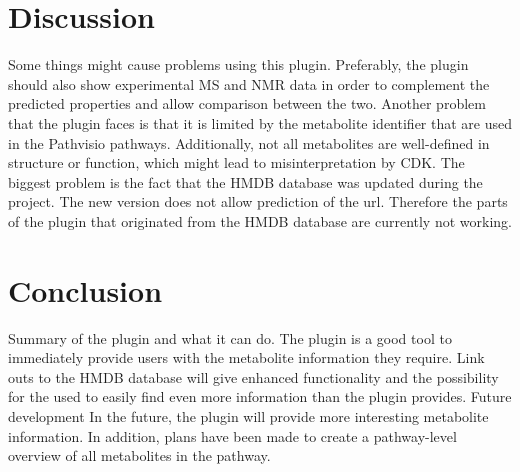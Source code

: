 \documentclass{bioinfo}
\begin{document}

\section{Discussion}
Some things might cause problems using this plugin. Preferably, the plugin should also show experimental MS and NMR data in order to complement the predicted properties and allow comparison between the two.
Another problem that the plugin faces is that it is limited by the metabolite identifier that are used in the Pathvisio pathways. Additionally, not all metabolites are well-defined in structure or function, which might lead to misinterpretation by CDK. 
The biggest problem is the fact that the HMDB database was updated during the project. The new version does not allow prediction of the url. Therefore the parts of the plugin that originated from the HMDB database are currently not working.

\section{Conclusion}

Summary of the plugin and what it can do.
The plugin is a good tool to immediately provide users with the metabolite information they require. Link outs to the HMDB database will give enhanced functionality and the possibility for the used to easily find even more information than the plugin provides.
Future development
In the future, the plugin will provide more interesting metabolite information. In addition, plans have been made to create a pathway-level overview of all metabolites in the pathway.


%
%
%
%
%
%
%

\end{document}
